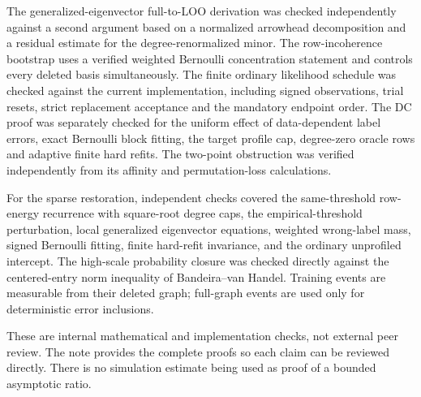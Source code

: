 The generalized-eigenvector full-to-LOO derivation was checked independently
against a second argument based on a normalized arrowhead decomposition
and a residual estimate for the degree-renormalized minor.
The row-incoherence bootstrap uses a verified weighted Bernoulli
concentration statement and controls every deleted basis simultaneously.
The finite ordinary likelihood schedule was checked against the current
implementation, including signed observations, trial resets, strict
replacement acceptance and the mandatory endpoint order.
The DC proof was separately checked for the uniform effect of
data-dependent label errors, exact Bernoulli block fitting, the target
profile cap, degree-zero oracle rows and adaptive finite hard refits.
The two-point obstruction was verified independently from its affinity
and permutation-loss calculations.

For the sparse restoration, independent checks covered the
same-threshold row-energy recurrence with square-root degree caps,
the empirical-threshold perturbation, local generalized eigenvector
equations, weighted wrong-label mass, signed Bernoulli fitting,
finite hard-refit invariance, and the ordinary unprofiled intercept.
The high-scale probability closure was checked directly against
the centered-entry norm inequality of Bandeira--van Handel.
Training events are measurable from their deleted graph; full-graph
events are used only for deterministic error inclusions.

These are internal mathematical and implementation checks, not external
peer review. The note provides the complete proofs so each claim can be
reviewed directly. There is no simulation estimate being used as proof
of a bounded asymptotic ratio.

